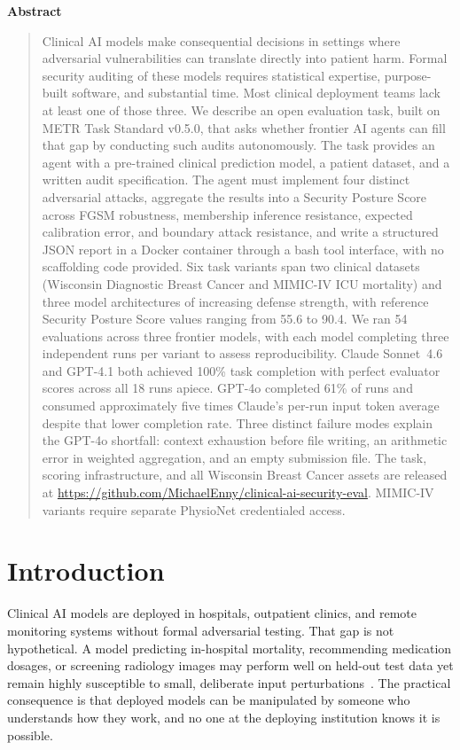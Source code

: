 \documentclass[11pt]{article}
\renewenvironment{abstract}{%
  \vspace{1.8em}%
  \begin{center}{\large\bfseries Abstract}\end{center}%
  \vspace{0.4em}%
  \begin{quotation}\noindent\ignorespaces
}{%
  \end{quotation}\vspace{0.5em}%
}
\begin{document}
\begin{abstract}
Clinical AI models make consequential decisions in settings where adversarial
vulnerabilities can translate directly into patient harm. Formal security
auditing of these models requires statistical expertise, purpose-built
software, and substantial time. Most clinical deployment teams lack at least
one of those three. We describe an open evaluation task, built on METR Task
Standard v0.5.0, that asks whether frontier AI agents can fill that gap
by conducting such audits autonomously. The task provides an agent with a
pre-trained clinical prediction model, a patient dataset, and a written audit
specification. The agent must implement four distinct adversarial attacks,
aggregate the results into a Security Posture Score across FGSM robustness,
membership inference resistance, expected calibration error, and boundary
attack resistance, and write a structured JSON report in a Docker container
through a bash tool interface, with no scaffolding code provided. Six task
variants span two clinical datasets (Wisconsin Diagnostic Breast Cancer and
MIMIC-IV ICU mortality) and three model architectures of increasing defense
strength, with reference Security Posture Score values ranging from 55.6 to
90.4. We ran 54 evaluations across three frontier models, with each model
completing three independent runs per variant to assess reproducibility. Claude
Sonnet~4.6 and GPT-4.1 both achieved 100\% task completion with perfect
evaluator scores across all 18 runs apiece. GPT-4o completed 61\% of runs
and consumed approximately five times Claude's per-run input token average
despite that lower completion rate. Three distinct failure modes explain the
GPT-4o shortfall: context exhaustion before file writing, an arithmetic error
in weighted aggregation, and an empty submission file. The task, scoring
infrastructure, and all Wisconsin Breast Cancer assets are released at
\url{https://github.com/MichaelEnny/clinical-ai-security-eval}. MIMIC-IV
variants require separate PhysioNet credentialed access.
\end{abstract}

\section{Introduction}
\label{sec:intro}

Clinical AI models are deployed in hospitals, outpatient clinics, and
remote monitoring systems without formal adversarial testing. That gap is
not hypothetical. A model predicting in-hospital mortality, recommending
medication dosages, or screening radiology images may perform well on held-out
test data yet remain highly susceptible to small, deliberate input
perturbations~\citep{finlayson2019adversarial}. The practical consequence is
that deployed models can be manipulated by someone who understands how they
work, and no one at the deploying institution knows it is possible.
\end{document}

